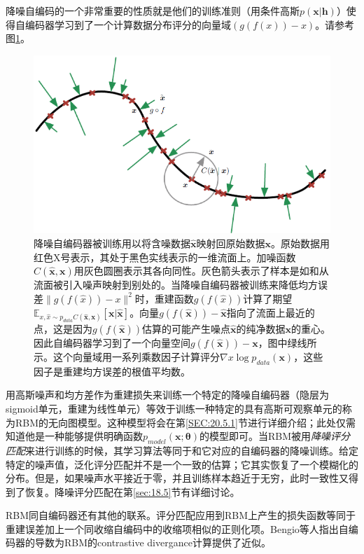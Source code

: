 降噪自编码的一个非常重要的性质就是他们的训练准则（用条件高斯$p(\bm{x}|\bm{h})$）使得自编码器学习到了一个计算数据分布评分的向量域$(g(f(x)) - x)$。请参考图\ref{fig:14.4}。
\begin{figure}[htbp] %
   \centering
   \includegraphics[width=4.5in]{fig/chap14/14_4.png} 
   \caption{降噪自编码器被训练用以将含噪数据$\hat{\bm{x}}$映射回原始数据$\bm{x}$。原始数据用红色X号表示，其处于黑色实线表示的一维流面上。加噪函数$C(\bm{\hat{x}},\bm{x})$用灰色圆圈表示其各向同性。灰色箭头表示了样本是如和从流面被引入噪声映射到别处的。当降噪自编码器被训练来降低均方误差$\|g(f(\hat{x})) -x \|^2$时，重建函数$g(f(\hat{x}))$计算了期望$\mathbb{E}_{x,\hat{x} \sim p_{data} C(\bm{\hat{x}}, \bm{x})}[\bm{x}|\bm{\hat{x}}]$。向量$g(f(\hat{\bm{x}})) - \hat{\bm{x}}$指向了流面上最近的点，这是因为$g(f(\hat{\bm{x}}))$估算的可能产生噪点$\bm{\hat{x}}$的纯净数据$\bm{x}$的重心。因此自编码器学习到了一个向量空间$g(f(\hat{\bm{x}})) - \bm{x}$，图中绿线所示。这个向量域用一系列乘数因子计算评分$\nabla x \log p_{data}(\bm{x})$，这些因子是重建均方误差的根值平均数。}
   \label{fig:14.4}
\end{figure}

用高斯噪声和均方差作为重建损失来训练一个特定的降噪自编码器（隐层为sigmoid单元，重建为线性单元）等效于训练一种特定的具有高斯可观察单元的称为RBM的无向图模型。这种模型将会在第\ref{SEC:20.5.1}节进行详细介绍；此处仅需知道他是一种能够提供明确函数$p_{model}(\bm{x};\bm{\theta})$的模型即可。当RBM被用\emph{降噪评分匹配}来进行训练的时候，其学习算法等同于和它对应的自编码器的降噪训练。给定特定的噪声值，泛化评分匹配并不是一个一致的估算；它其实恢复了一个模糊化的分布。但是，如果噪声水平接近于零，并且训练样本趋近于无穷，此时一致性又得到了恢复。降噪评分匹配在第\ref{sec:18.5}节有详细讨论。

RBM同自编码器还有其他的联系。评分匹配应用到RBM上产生的损失函数等同于重建误差加上一个同收缩自编码中的收缩项相似的正则化项。Bengio等人指出自编码器的导数为RBM的contrastive divergance计算提供了近似。

